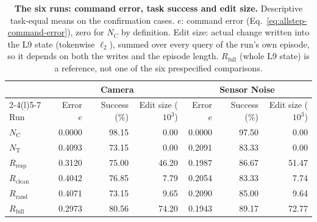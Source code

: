 \begin{table}[t]
\caption{\textbf{The six runs: command error, task success and edit size.} Descriptive task-equal means on the confirmation cases. $e$: command error (Eq.~\ref{eq:allstep-command-error}), zero for $N_C$ by definition. Edit size: actual change written into the L9 state (tokenwise $\ell_2$), summed over every query of the run's own episode, so it depends on both the writes and the episode length. $R_{\mathrm{full}}$ (whole L9 state) is a reference, not one of the six prespecified comparisons.}

\centering\small
\setlength{\tabcolsep}{9pt}
\begin{tabular}{@{}lrrrrrr@{}}
\toprule
 & \multicolumn{3}{c}{Camera} & \multicolumn{3}{c}{Sensor Noise}\\
\cmidrule(lr){2-4}\cmidrule(l){5-7}
Run & Error $e$ & Success (\%) & Edit size ($10^3$) & Error $e$ & Success (\%) & Edit size ($10^3$)\\
\midrule
$N_{\mathrm{C}}$ & 0.0000 & 98.15 & 0.00 & 0.0000 & 97.50 & 0.00\\
$N_{\mathrm{T}}$ & 0.4093 & 73.15 & 0.00 & 0.2091 & 83.33 & 0.00\\
$R_{\mathrm{resp}}$ & 0.3120 & 75.00 & 46.20 & 0.1987 & 86.67 & 51.47\\
$R_{\mathrm{clean}}$ & 0.4042 & 76.85 & 7.79 & 0.2054 & 83.33 & 7.74\\
$R_{\mathrm{rand}}$ & 0.4071 & 73.15 & 9.65 & 0.2090 & 85.00 & 9.64\\
$R_{\mathrm{full}}$ & 0.2973 & 80.56 & 74.20 & 0.1943 & 89.17 & 72.77\\
\bottomrule
\end{tabular}

\label{tab:allstep-restoration-arms}
\end{table}
